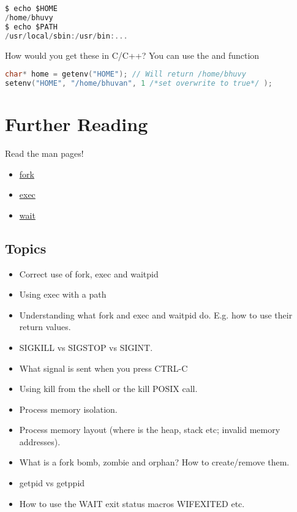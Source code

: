 \begin{lstlisting}[language=C]
$ echo $HOME
/home/bhuvy
$ echo $PATH
/usr/local/sbin:/usr/bin:...
\end{lstlisting}

How would you get these in C/C++? You can use the  and  function

\begin{lstlisting}[language=C]
char* home = getenv("HOME"); // Will return /home/bhuvy
setenv("HOME", "/home/bhuvan", 1 /*set overwrite to true*/ );
\end{lstlisting}

\section{Further Reading}\label{how-can-i-find-out-more}

Read the man pages! 
\begin{itemize}
\item \href{http://man7.org/linux/man-pages/man2/fork.2.html}{fork} 
\item \href{http://man7.org/linux/man-pages/man3/exec.3.html}{exec} 
\item \href{http://man7.org/linux/man-pages/man2/wait.2.html}{wait}
\end{itemize}

\subsection{Topics}\label{topics}

\begin{itemize}
\tightlist
\item
  Correct use of fork, exec and waitpid
\item
  Using exec with a path
\item
  Understanding what fork and exec and waitpid do. E.g. how to use their return values.
\item
  SIGKILL vs SIGSTOP vs SIGINT.
\item
  What signal is sent when you press CTRL-C
\item
  Using kill from the shell or the kill POSIX call.
\item
  Process memory isolation.
\item
  Process memory layout (where is the heap, stack etc; invalid memory addresses).
\item
  What is a fork bomb, zombie and orphan? How to create/remove them.
\item
  getpid vs getppid
\item
  How to use the WAIT exit status macros WIFEXITED etc.
\end{itemize}

